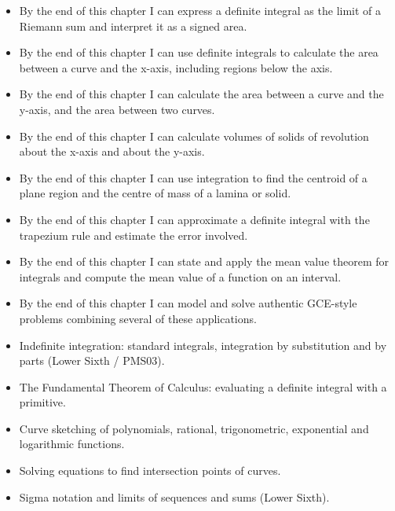 \documentclass[11pt]{article}
\begin{document}
\begin{objectifs}
\begin{itemize}
\item By the end of this chapter I can express a definite integral as the limit of a Riemann sum and interpret it as a signed area.
\item By the end of this chapter I can use definite integrals to calculate the area between a curve and the x-axis, including regions below the axis.
\item By the end of this chapter I can calculate the area between a curve and the y-axis, and the area between two curves.
\item By the end of this chapter I can calculate volumes of solids of revolution about the x-axis and about the y-axis.
\item By the end of this chapter I can use integration to find the centroid of a plane region and the centre of mass of a lamina or solid.
\item By the end of this chapter I can approximate a definite integral with the trapezium rule and estimate the error involved.
\item By the end of this chapter I can state and apply the mean value theorem for integrals and compute the mean value of a function on an interval.
\item By the end of this chapter I can model and solve authentic GCE-style problems combining several of these applications.
\end{itemize}
\end{objectifs}

\begin{prerequis}
\begin{itemize}
\item Indefinite integration: standard integrals, integration by substitution and by parts (Lower Sixth / PMS03).
\item The Fundamental Theorem of Calculus: evaluating a definite integral with a primitive.
\item Curve sketching of polynomials, rational, trigonometric, exponential and logarithmic functions.
\item Solving equations to find intersection points of curves.
\item Sigma notation and limits of sequences and sums (Lower Sixth).
\end{itemize}
\end{prerequis}

\newpage
\end{document}
